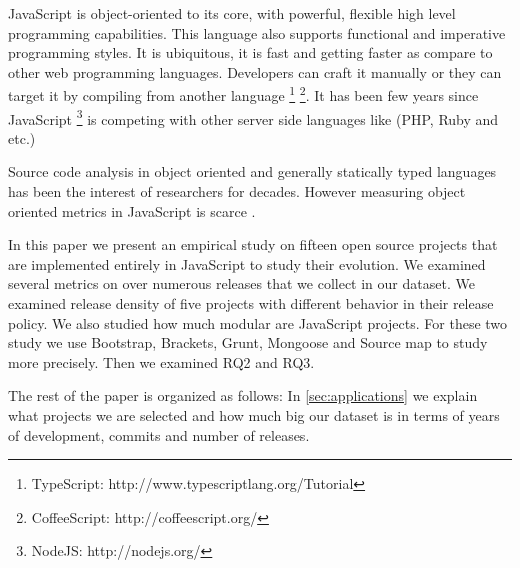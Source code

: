 
JavaScript is object-oriented to its core, with powerful, flexible high level programming capabilities. This language also supports functional and imperative programming styles. It is ubiquitous, it is fast and getting faster as compare to other web programming languages. Developers can craft it manually or they can target it by compiling from another language \footnote{TypeScript: http://www.typescriptlang.org/Tutorial} \footnote{CoffeeScript: http://coffeescript.org/}. It has been few years since JavaScript \footnote{NodeJS: http://nodejs.org/} is competing with other server side languages like (PHP, Ruby and etc.)

Source code analysis in object oriented and generally statically typed languages has been the interest of researchers for decades. However measuring object oriented metrics in JavaScript is scarce \cite{Richards:2010:ADB:1809028.1806598} \cite{6320536}.


In this paper we present an empirical study on fifteen open source projects that are implemented entirely in JavaScript to study their evolution. We examined several metrics on over numerous releases that we collect in our dataset. We examined release density of five projects with different behavior in their release policy. We also studied how much modular are JavaScript projects. For these two study we use Bootstrap, Brackets, Grunt, Mongoose and Source map to study more precisely.
 Then we examined RQ2 and RQ3.

The rest of the paper is organized as follows: In \ref{sec:applications} we explain what projects we are selected and how much big our dataset is in terms of years of development, commits and number of releases.


